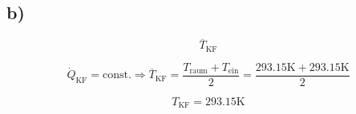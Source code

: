 

\subsection*{b)}

\[
\overline{T}_{\text{KF}}
\]

\[
\dot{Q}_{\text{KF}} = \text{const.} \Rightarrow \overline{T}_{\text{KF}} = \frac{T_{\text{raum}} + T_{\text{ein}}}{2} = \frac{293.15 \text{K} + 293.15 \text{K}}{2}
\]

\[
T_{\text{KF}} = 293.15 \text{K}
\]